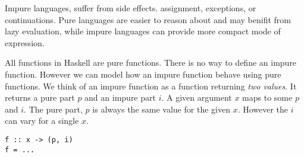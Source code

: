 Impure languages, suffer from side effects. assignment, exceptions, or continuations. 
Pure languages are easier to reason about 
and may benifit from lazy evaluation, while impure languages can provide more compact mode of expression.



All functions in Haskell are pure functions. There is no way to define an impure function.
However we can model how an impure function behave using pure functions. 
We think of an impure function as a function returning \textit{two values}. 
It returns a pure part $p$ and an impure part $i$. A given argument $x$ maps to some $p$ and $i$.
The pure part, $p$ is always the same value for the given $x$. However the $i$ can vary for a single $x$. 

\begin{lstlisting}
f :: x -> (p, i)
f = ...
\end{lstlisting}